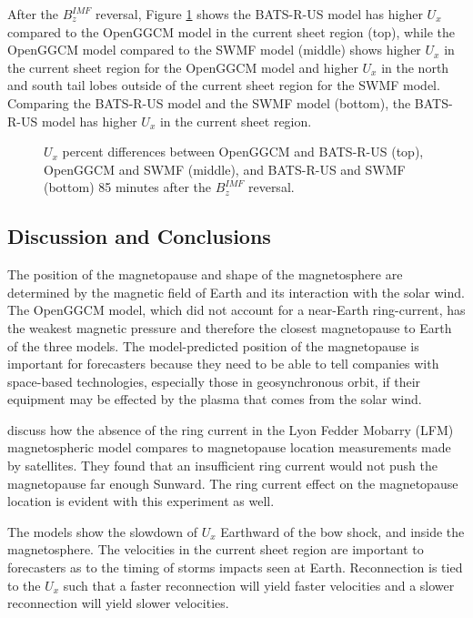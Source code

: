 After the $B_z^{IMF}$ reversal, Figure \ref{fig:UxdiffAfterFlip} shows the
BATS-R-US model has higher $U_x$ compared to the OpenGGCM model in the current
sheet region (top), while the OpenGGCM model compared to the SWMF model (middle)
shows higher $U_x$ in the current sheet region for the OpenGGCM model and higher
$U_x$ in the north and south tail lobes outside of the current sheet region for
the SWMF model. Comparing the BATS-R-US model and the SWMF model (bottom), the
BATS-R-US model has higher $U_x$ in the current sheet region.
\begin{figure}
	\centering
	\caption{$U_x$ percent differences between OpenGGCM and
	BATS-R-US (top), OpenGGCM and SWMF (middle), and BATS-R-US and SWMF (bottom)
	85 minutes after the $B_z^{IMF}$ reversal.}
	\figSpace
	\label{fig:UxdiffAfterFlip}
\end{figure}

\subsection{Discussion and Conclusions}

The position of the magnetopause and shape of the magnetosphere are
determined by the magnetic field of Earth and its interaction with the
solar wind. The OpenGGCM model, which did not account for a
near-Earth ring-current, has the weakest magnetic pressure and therefore the
closest magnetopause to Earth of the three models. The model-predicted position
of the magnetopause is important for forecasters because they need to be able to tell companies with
space-based technologies, especially those in geosynchronous orbit, if their
equipment may be effected by the plasma that comes from the solar
wind.

\cite{Garcia2007} discuss how the absence of the ring current in the Lyon
Fedder Mobarry (LFM) magnetospheric model compares to magnetopause location
measurements made by satellites. They found that an insufficient ring current would not push the
magnetopause far enough Sunward. The ring current effect on the magnetopause
location is evident with this experiment as well.

The models show the slowdown of $U_x$ Earthward of the
bow shock, and inside the magnetosphere. The velocities in the current sheet
region are important to forecasters as to the timing of storms impacts seen at
Earth. Reconnection is tied to the
$U_x$ such that a faster reconnection will yield faster velocities and a slower
reconnection will yield slower velocities.

